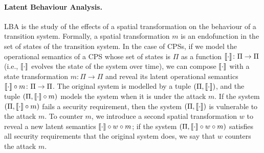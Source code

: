 \paragraph{Latent Behaviour Analysis.} LBA is the study of the effects of a spatial transformation on the behaviour of a transition system. Formally, a spatial transformation $m$ is an endofunction in the set of states of the transition system. In the case of CPSs, if we model the operational semantics of a CPS whose set of states is $\Pi$ as a function ${{{\llbracket\cdot\rrbracket}}}\colon\Pi\rightarrow\Pi$ (i.e., ${{{\llbracket\cdot\rrbracket}}}$ evolves the state of the system over time), we can compose ${{{\llbracket\cdot\rrbracket}}}$ with a state transformation $m\colon \Pi\rightarrow\Pi$ and reveal its latent operational semantics ${{{\llbracket\cdot\rrbracket}}}\circ m\colon\Pi\rightarrow\Pi$. The original system is modelled by a tuple $(\Pi,{{{\llbracket\cdot\rrbracket}}})$, and the tuple $(\Pi,{{{\llbracket\cdot\rrbracket}}}\circ m)$ models the system when it is under the attack $m$. If the system $(\Pi,{{{\llbracket\cdot\rrbracket}}}\circ m)$ fails a security requirement, then the system $(\Pi,{{{\llbracket\cdot\rrbracket}}})$ is vulnerable to the attack $m$. To counter $m$, we introduce a second spatial transformation $w$ to reveal a new latent semantics ${{{\llbracket\cdot\rrbracket}}}\circ w\circ m$; if the system $(\Pi,{{{\llbracket\cdot\rrbracket}}}\circ w\circ m)$ satisfies all security requirements that the original system does, we say that $w$ counters the attack $m$.


